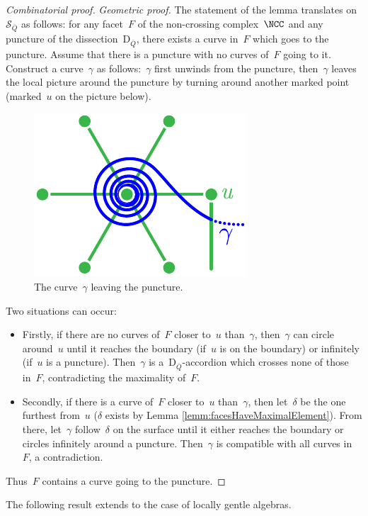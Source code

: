 \documentclass{amsart}
\theoremstyle{definition}
\newcommand{\para}[1]{\medskip\noindent\textit{#1.}} %
\newcommand{\surface}{\mathcal{S}} %
\newcommand{\dissection}{\mathrm{D}} %
\begin{document}
\begin{proof}[Combinatorial proof]
\para{Geometric proof}
The statement of the lemma translates on~$\surface_{\bar Q}$ as follows: for any facet~$F$ of the non-crossing complex~$\NCC$ and any puncture of the dissection~$\dissection_{\bar Q}$, there exists a curve in~$F$ which goes to the puncture.
Assume that there is a puncture with no curves of~$F$ going to it.
Construct a curve~$\gamma$ as follows:~$\gamma$ first unwinds from the puncture, then~$\gamma$ leaves the local picture around the puncture by turning around another marked point (marked~$u$ on the picture below).

\begin{figure}[h]
	\capstart
	\centerline{\includegraphics[scale=.7]{infiniteCurve1.pdf}}
	\caption{The curve~$\gamma$ leaving the puncture.}
	\label{fig:aroundPuncture2}
\end{figure}

Two situations can occur:
\begin{itemize}
\item Firstly, if there are no curves of~$F$ closer to~$u$ than~$\gamma$, then~$\gamma$ can circle around~$u$ until it reaches the boundary (if~$u$ is on the boundary) or infinitely (if~$u$ is a puncture).
Then~$\gamma$ is a~$\dissection_{\bar Q}$-accordion which crosses none of those in~$F$, contradicting the maximality of~$F$.
\item Secondly, if there is a curve of~$F$ closer to~$u$ than~$\gamma$, then let~$\delta$ be the one furthest from~$u$ ($\delta$ exists by Lemma \ref{lemm:facesHaveMaximalElement}).
From there, let~$\gamma$ follow~$\delta$ on the surface until it either reaches the boundary or circles infinitely around a puncture.  
Then~$\gamma$ is compatible with all curves in~$F$, a contradiction.
\end{itemize}
Thus~$F$ contains a curve going to the puncture.
\end{proof}

The following result extends \cite[Prop.~2.28]{PaluPilaudPlamondon} to the case of locally gentle algebras.
\end{document}
